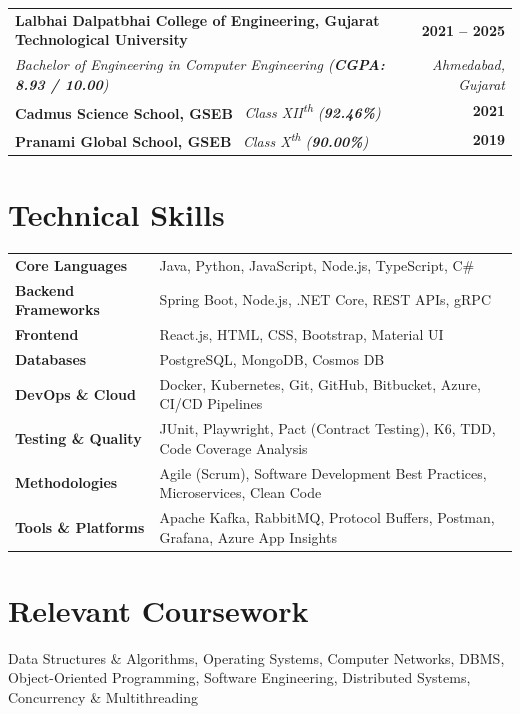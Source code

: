 \documentclass[a4paper,10pt]{article}
\begin{document}
\begin{tabularx}{\textwidth}{X r}
\textbf{Lalbhai Dalpatbhai College of Engineering, Gujarat Technological University} & \textbf{2021 -- 2025} \\
\textit{Bachelor of Engineering in Computer Engineering (\textbf{CGPA: 8.93 / 10.00})} & \textit{Ahmedabad, Gujarat}  \\
\addlinespace[4pt]
\textbf{Cadmus Science School, GSEB} ~\textit{Class XII\textsuperscript{th} (\textbf{92.46\%})} & \textbf{2021} \\
\addlinespace[2pt]
\textbf{Pranami Global School, GSEB} ~\textit{Class X\textsuperscript{th} (\textbf{90.00\%})} & \textbf{2019} \\
\end{tabularx}

\vspace{-0.8em}

\section*{Technical Skills}
\vspace{-0.5em}

\begin{tabularx}{\textwidth}{@{} >{\raggedright}p{4.2cm} X @{}}
\textbf{Core Languages} & Java, Python, JavaScript, Node.js, TypeScript, C\# \\
\textbf{Backend Frameworks} & Spring Boot, Node.js, .NET Core, REST APIs, gRPC \\
\textbf{Frontend} & React.js, HTML, CSS, Bootstrap, Material UI \\
\textbf{Databases} & PostgreSQL, MongoDB, Cosmos DB \\
\textbf{DevOps \& Cloud} & Docker, Kubernetes, Git, GitHub, Bitbucket, Azure, CI/CD Pipelines \\
\textbf{Testing \& Quality} & JUnit, Playwright, Pact (Contract Testing), K6, TDD, Code Coverage Analysis \\
\textbf{Methodologies} & Agile (Scrum), Software Development Best Practices, Microservices, Clean Code \\
\textbf{Tools \& Platforms} & Apache Kafka, RabbitMQ, Protocol Buffers, Postman, Grafana, Azure App Insights \\
\end{tabularx}
\vspace{-1em}

\section*{Relevant Coursework}
\vspace{-0.5em}
Data Structures \& Algorithms, Operating Systems, Computer Networks, DBMS, Object-Oriented Programming, Software Engineering, Distributed Systems, Concurrency \& Multithreading
\vspace{-0.6em}
\end{document}
